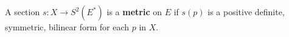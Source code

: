 A section $s : X \rightarrow S^2(E^*)$ is a \textbf{metric} on $E$ if $s(p)$ is a positive definite, symmetric, bilinear form for each $p$ in $X$.
